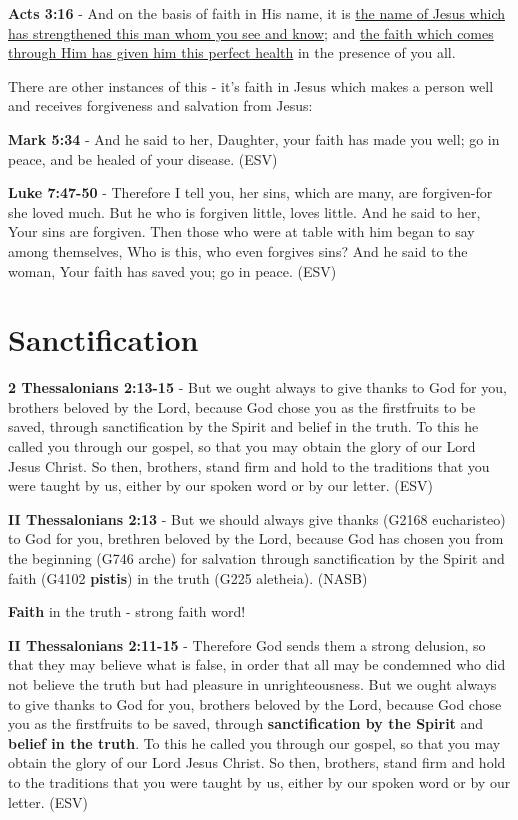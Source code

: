 \documentclass[11pt]{article}
\begin{document}
\textbf{Acts 3:16} - And on the basis of faith in His name, it is \uline{the name of Jesus which has strengthened this man whom you see and know}; and \uline{the faith which comes through Him has given him this perfect health} in the presence of you all.

There are other instances of this - it's faith in Jesus which makes a person well and receives forgiveness and salvation from Jesus:

\textbf{Mark 5:34} -  And he said to her, Daughter, your faith has made you well; go in peace, and be healed of your disease.  (ESV)

\textbf{Luke 7:47-50} - Therefore I tell you, her sins, which are many, are forgiven-for she loved much. But he who is forgiven little, loves little. And he said to her, Your sins are forgiven. Then those who were at table with him began to say among themselves, Who is this, who even forgives sins? And he said to the woman, Your faith has saved you; go in peace. (ESV)

\section{Sanctification}
\label{sec:org785b561}
\textbf{2 Thessalonians 2:13-15} -  But we ought always to give thanks to God for you, brothers beloved by the Lord, because God chose you as the firstfruits to be saved, through sanctification by the Spirit and belief in the truth.  To this he called you through our gospel, so that you may obtain the glory of our Lord Jesus Christ.  So then, brothers, stand firm and hold to the traditions that you were taught by us, either by our spoken word or by our letter.  (ESV)

\textbf{II Thessalonians 2:13} - But we should always give thanks (G2168 eucharisteo) to God for you, brethren beloved by the Lord, because God has chosen you from the beginning (G746 arche) for salvation through sanctification by the Spirit and faith (G4102 \textbf{pistis}) in the truth (G225 aletheia). (NASB)

\textbf{Faith} in the truth - strong faith word!

\textbf{II Thessalonians 2:11-15} - Therefore God sends them a strong delusion, so that they may believe what is false, in order that all may be condemned who did not believe the truth but had pleasure in unrighteousness. But we ought always to give thanks to God for you, brothers beloved by the Lord, because God chose you as the firstfruits to be saved, through \textbf{sanctification by the Spirit} and \textbf{belief in the truth}. To this he called you through our gospel, so that you may obtain the glory of our Lord Jesus Christ. So then, brothers, stand firm and hold to the traditions that you were taught by us, either by our spoken word or by our letter.  (ESV)
\end{document}
